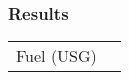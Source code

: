 % 
% 
%
\Large
\subsubsection*{Results}
  \begin{tabular}{p{2 cm}|p{2 cm}|}
  \cline{2-2}
  Fuel (USG)&\\
  \cline{2-2}
  \end{tabular}
  \normalsize
  
  